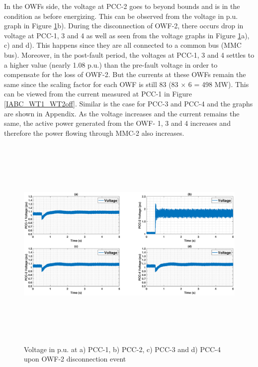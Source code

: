 In the \gls{OWF}s side, the voltage at \gls{PCC}-2 goes to beyond bounds and is in the condition as before energizing. This can be observed from the voltage in p.u. graph in Figure \ref{VACP_WT134_WT2off}b). During the disconnection of \gls{OWF}-2, there occurs drop in voltage at \gls{PCC}-1, 3 and 4 as well as seen from the voltage graphs in Figure \ref{VACP_WT134_WT2off}a), c) and d). This happens since they are all connected to a common bus (\gls{MMC} bus). Moreover, in the post-fault period, the voltages at \gls{PCC}-1, 3 and 4 settles to a higher value (nearly 1.08 p.u.) than the pre-fault voltage in order to compensate for the loss of \gls{OWF}-2. But the currents at these \gls{OWF}s remain the same since the scaling factor for each \gls{OWF} is still 83 (83 $\times$ 6 = 498 MW). This can be viewed from the current measured at \gls{PCC}-1 in Figure \ref{IABC_WT1_WT2off}. Similar is the case for \gls{PCC}-3 and \gls{PCC}-4 and the graphs are shown in Appendix. As the voltage increases and the current remains the same, the active power generated from the \gls{OWF}- 1, 3 and 4 increases and therefore the power flowing through \gls{MMC}-2 also increases.

\begin{figure}[H]
\hspace*{-1.7cm}
    \includegraphics[height = 10.5cm,width = 20.5cm]{Diagrams/Chapter_5/VACP_WT1234_WT2off.eps}
    \caption{Voltage in p.u. at a) PCC-1, b) PCC-2, c) PCC-3 and d) PCC-4 upon OWF-2 disconnection event}
    \label{VACP_WT134_WT2off}
\end{figure}

